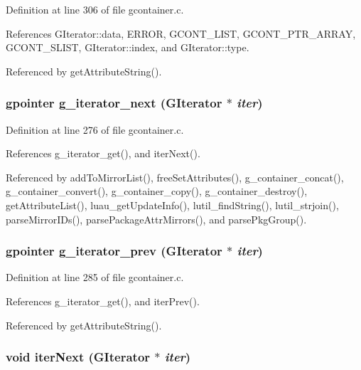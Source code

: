 Definition at line 306 of file gcontainer.c.

References GIterator::data, ERROR, GCONT\_\-LIST, GCONT\_\-PTR\_\-ARRAY, GCONT\_\-SLIST, GIterator::index, and GIterator::type.

Referenced by get\-Attribute\-String().
\subsubsection{\setlength{\rightskip}{0pt plus 5cm}gpointer g\_\-iterator\_\-next ({\bf GIterator} $\ast$ {\em iter})}\label{gcontainer_8c_a15}




Definition at line 276 of file gcontainer.c.

References g\_\-iterator\_\-get(), and iter\-Next().

Referenced by add\-To\-Mirror\-List(), free\-Set\-Attributes(), g\_\-container\_\-concat(), g\_\-container\_\-convert(), g\_\-container\_\-copy(), g\_\-container\_\-destroy(), get\-Attribute\-List(), luau\_\-get\-Update\-Info(), lutil\_\-find\-String(), lutil\_\-strjoin(), parse\-Mirror\-IDs(), parse\-Package\-Attr\-Mirrors(), and parse\-Pkg\-Group().
\subsubsection{\setlength{\rightskip}{0pt plus 5cm}gpointer g\_\-iterator\_\-prev ({\bf GIterator} $\ast$ {\em iter})}\label{gcontainer_8c_a16}




Definition at line 285 of file gcontainer.c.

References g\_\-iterator\_\-get(), and iter\-Prev().

Referenced by get\-Attribute\-String().
\subsubsection{\setlength{\rightskip}{0pt plus 5cm}void iter\-Next ({\bf GIterator} $\ast$ {\em iter})\hspace{0.3cm}{\tt  [static]}}\label{gcontainer_8c_a0}




